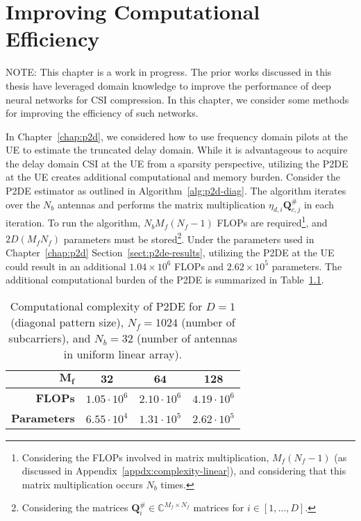 \chapter{Improving Computational Efficiency} \label{chap:comp-effic}

{\color{red} NOTE: This chapter is a work in progress.} The prior works discussed in this thesis have leveraged domain knowledge to improve the performance of deep neural networks for CSI compression. In this chapter, we consider some methods for improving the efficiency of such networks.

In Chapter~\ref{chap:p2d}, we considered how to use frequency domain pilots at the UE to estimate the truncated delay domain. While it is advantageous to acquire the delay domain CSI at the UE from a sparsity perspective, utilizing the P2DE at the UE creates additional computational and memory burden. Consider the P2DE estimator as outlined in Algorithm~\ref{alg:p2d-diag}. The algorithm iterates over the $N_b$ antennas and performs the matrix multiplication $\eta_{d,i}\mathbf{Q}_{c,j}^{\#}$ in each iteration. To run the algorithm, $N_bM_f(N_f-1)$ FLOPs are required\footnote{Considering the FLOPs involved in matrix multiplication, $M_f(N_f-1)$ (as discussed in Appendix~\ref{appdx:complexity-linear}), and considering that this matrix multiplication occurs $N_b$ times.}, and $2D(M_fN_f)$ parameters must be stored\footnote{Considering the matrices $\mathbf{Q}_i^{\#} \in \mathbb{C}^{M_f \times N_f}$ matrices for $i \in [1, \dots, D]$.}. Under the parameters used in Chapter~\ref{chap:p2d} Section~\ref{sect:p2de-results}, utilizing the P2DE at the UE could result in an additional $1.04\times 10^{6}$ FLOPs and $2.62\times 10^{5}$ parameters. The additional computational burden of the P2DE is summarized in Table~\ref{tab:p2de-comp}. %

\begin{table}[!h]
\caption{Computational complexity of P2DE for $D=1$ (diagonal pattern size), $N_f=1024$ (number of subcarriers), and $N_b=32$ (number of antennas in uniform linear array).}
\begin{center}
\label{tab:p2de-comp} 
\begin{tabular}{|r|c|c|c|}
\hline
$\mathbf{M_f}$      & $\mathbf{32}$      & $\mathbf{64}$       & $\mathbf{128}$     \\ \hline
\textbf{FLOPs}      & $1.05\cdot 10^{6}$ & $2.10\cdot 10^{6}$  & $4.19\cdot 10^{6}$ \\ \hline
\textbf{Parameters} & $6.55\cdot 10^{4}$ & $1.31\cdot 10^{5}$  & $2.62\cdot 10^{5}$  \\ \hline
\end{tabular}
\end{center}
\vspace*{-0.3mm}
\end{table}

